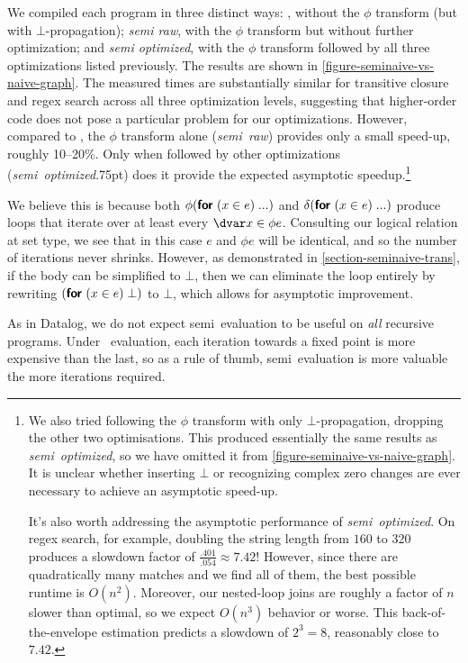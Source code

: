 \clearpage
\noindent
\XXX
We compiled each program in three distinct ways: \emph{\naive{}}, without the
$\phi$ transform (but with $\bot$-propagation); \emph{semi\naive{} raw}, with
the $\phi$ transform but without further optimization; and \emph{semi\naive{}
  optimized}, with the $\phi$ transform followed by all three optimizations
listed previously. The results are shown in
\cref{figure-seminaive-vs-naive-graph}.
%
The measured times are substantially similar for transitive closure and regex
search across all three optimization levels, suggesting that higher-order code
does not pose a particular problem for our optimizations. However, compared to
\emph{\naive}, the $\phi$ transform alone (\emph{semi\naive\ raw}) provides only
a small speed-up, roughly 10--20\%. Only when followed by other optimizations
(\emph{semi\naive\ optimized}\kern.75pt) does it provide the expected asymptotic
speedup.\footnote{We also tried following the $\phi$ transform with only
  $\bot$-propagation, dropping the other two optimisations. This produced
  essentially the same results as \emph{semi\naive\ optimized}, so we have
  omitted it from \cref{figure-seminaive-vs-naive-graph}. It is unclear whether
  inserting $\bot$ or recognizing complex zero changes are ever necessary to
  achieve an asymptotic speed-up.

  It's also worth addressing the asymptotic performance of
  \emph{semi\naive\ optimized}. On regex search, for example, doubling the string
  length from $160$ to $320$ produces a slowdown factor of $\frac{.401}{.054}
  \approx 7.42$! However, since there are quadratically many matches and we find
  all of them, the best possible runtime is $O(n^2)$. Moreover, our nested-loop
  joins are roughly a factor of $n$ slower than optimal, so we expect $O(n^3)$
  behavior or worse. This back-of-the-envelope estimation predicts a slowdown of
  $2^3 = 8$, reasonably close to $7.42$.}

We believe this is because both $\phi(\textsf{\bfseries for}_{}\;({{x} \in e})\; ...)$ and $\delta(\textsf{\bfseries for}_{}\;({{x} \in e})\;
...)$ produce loops that iterate over at least every $\dvar x \in \phi e$.
Consulting our logical relation at set type, we see that in this case $e$ and
$\phi e$ will be identical, and so the number of iterations never shrinks.
However, as demonstrated in \cref{section-seminaive-trans}, if the body can be
simplified to $\bot$, then we can eliminate the loop entirely by rewriting
$(\textsf{\bfseries for}_{}\;({{x} \in e})\; \bot)$ to $\bot$, which allows for asymptotic improvement.

As in Datalog, we do not expect semi\naive\ evaluation to be useful on
\emph{all} recursive programs. Under \naive\ evaluation, each iteration towards
a fixed point is more expensive than the last, so as a rule of thumb,
semi\naive\ evaluation is more valuable the more iterations required.

